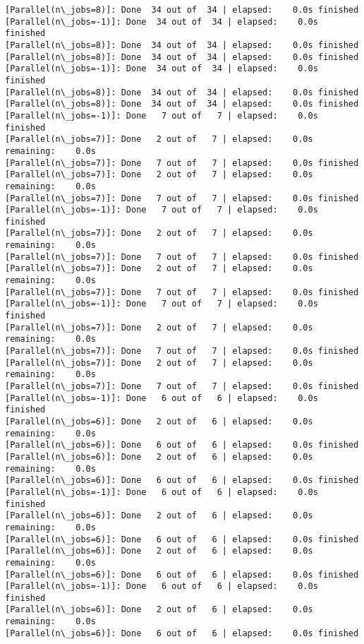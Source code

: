 \documentclass[11pt]{article}
\begin{document}
\begin{Verbatim}[commandchars=\\\{\}]
[Parallel(n\_jobs=8)]: Done  34 out of  34 | elapsed:    0.0s finished
[Parallel(n\_jobs=-1)]: Done  34 out of  34 | elapsed:    0.0s finished
[Parallel(n\_jobs=8)]: Done  34 out of  34 | elapsed:    0.0s finished
[Parallel(n\_jobs=8)]: Done  34 out of  34 | elapsed:    0.0s finished
[Parallel(n\_jobs=-1)]: Done  34 out of  34 | elapsed:    0.0s finished
[Parallel(n\_jobs=8)]: Done  34 out of  34 | elapsed:    0.0s finished
[Parallel(n\_jobs=8)]: Done  34 out of  34 | elapsed:    0.0s finished
[Parallel(n\_jobs=-1)]: Done   7 out of   7 | elapsed:    0.0s finished
[Parallel(n\_jobs=7)]: Done   2 out of   7 | elapsed:    0.0s remaining:    0.0s
[Parallel(n\_jobs=7)]: Done   7 out of   7 | elapsed:    0.0s finished
[Parallel(n\_jobs=7)]: Done   2 out of   7 | elapsed:    0.0s remaining:    0.0s
[Parallel(n\_jobs=7)]: Done   7 out of   7 | elapsed:    0.0s finished
[Parallel(n\_jobs=-1)]: Done   7 out of   7 | elapsed:    0.0s finished
[Parallel(n\_jobs=7)]: Done   2 out of   7 | elapsed:    0.0s remaining:    0.0s
[Parallel(n\_jobs=7)]: Done   7 out of   7 | elapsed:    0.0s finished
[Parallel(n\_jobs=7)]: Done   2 out of   7 | elapsed:    0.0s remaining:    0.0s
[Parallel(n\_jobs=7)]: Done   7 out of   7 | elapsed:    0.0s finished
[Parallel(n\_jobs=-1)]: Done   7 out of   7 | elapsed:    0.0s finished
[Parallel(n\_jobs=7)]: Done   2 out of   7 | elapsed:    0.0s remaining:    0.0s
[Parallel(n\_jobs=7)]: Done   7 out of   7 | elapsed:    0.0s finished
[Parallel(n\_jobs=7)]: Done   2 out of   7 | elapsed:    0.0s remaining:    0.0s
[Parallel(n\_jobs=7)]: Done   7 out of   7 | elapsed:    0.0s finished
[Parallel(n\_jobs=-1)]: Done   6 out of   6 | elapsed:    0.0s finished
[Parallel(n\_jobs=6)]: Done   2 out of   6 | elapsed:    0.0s remaining:    0.0s
[Parallel(n\_jobs=6)]: Done   6 out of   6 | elapsed:    0.0s finished
[Parallel(n\_jobs=6)]: Done   2 out of   6 | elapsed:    0.0s remaining:    0.0s
[Parallel(n\_jobs=6)]: Done   6 out of   6 | elapsed:    0.0s finished
[Parallel(n\_jobs=-1)]: Done   6 out of   6 | elapsed:    0.0s finished
[Parallel(n\_jobs=6)]: Done   2 out of   6 | elapsed:    0.0s remaining:    0.0s
[Parallel(n\_jobs=6)]: Done   6 out of   6 | elapsed:    0.0s finished
[Parallel(n\_jobs=6)]: Done   2 out of   6 | elapsed:    0.0s remaining:    0.0s
[Parallel(n\_jobs=6)]: Done   6 out of   6 | elapsed:    0.0s finished
[Parallel(n\_jobs=-1)]: Done   6 out of   6 | elapsed:    0.0s finished
[Parallel(n\_jobs=6)]: Done   2 out of   6 | elapsed:    0.0s remaining:    0.0s
[Parallel(n\_jobs=6)]: Done   6 out of   6 | elapsed:    0.0s finished

\end{Verbatim}
\end{document}

